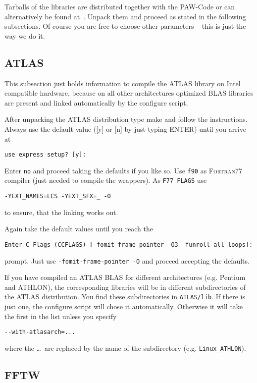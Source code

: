 \documentclass[a4paper,10pt]{article}
\newcommand{\PAW}{\textsc{PAW}}
\begin{document}
Tarballs of the libraries are distributed together with
the \PAW-Code or can alternatively be found at~\cite{mpich,atlas,fftw}.
Unpack them and proceed as stated in the following subsections.  Of course
you are free to choose other parameters -- this is just the way we do it.


\subsection{ATLAS}

This subsection just holds information to compile the ATLAS library on Intel
compatible hardware, because on all other architectures optimized BLAS
libraries are present and linked automatically by the configure script.

After unpacking the ATLAS distribution type make and follow the
instructions. Always use the default value ([y] or [n] by just typing ENTER) until you arrive at
\begin{verbatim}
use express setup? [y]:
\end{verbatim}
Enter \texttt{no} and proceed taking the defaults if you like so.  
Use \texttt{f90} as  \textsc{Fortran77} compiler (just needed to compile the wrappers). As \texttt{F77 FLAGS} use
\begin{verbatim}
-YEXT_NAMES=LCS -YEXT_SFX=_ -O
\end{verbatim}
to ensure, that the linking works out.

Again take the default values until you reach the 
\begin{verbatim}
Enter C Flags (CCFLAGS) [-fomit-frame-pointer -O3 -funroll-all-loops]: 
\end{verbatim}
prompt.  Just use \texttt{-fomit-frame-pointer -O} and proceed accepting the defaults.

If you have compiled an ATLAS BLAS for different architectures (e.g. Pentium
and ATHLON), the corresponding libraries will be in different
subdirectories of the ATLAS distribution. You find these subdirectories in
\texttt{ATLAS/lib}.  If there is just one, the configure script will chose it
automatically. Otherwise it will take the first in the list unless you specify 
\begin{verbatim}
--with-atlasarch=...
\end{verbatim}
where the \ldots\ are replaced by the name of the subdirectory (e.g. \texttt{Linux\_ATHLON}).


\subsection{FFTW}
\end{document}
